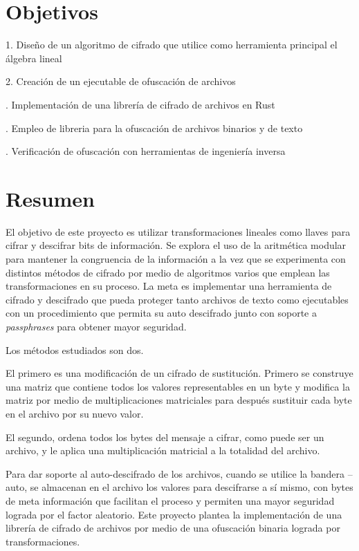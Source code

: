 \documentclass[a4paper]{article}
\begin{document}
\vfill
\newpage

\section{Objetivos}

1. Diseño de un algoritmo de cifrado que utilice como herramienta principal el
álgebra lineal

2. Creación de un ejecutable de ofuscación de archivos

. Implementación de una librería de cifrado de archivos en Rust

. Empleo de libreria para la ofuscación de archivos binarios y de
texto

. Verificación de ofuscación con herramientas de ingeniería inversa

\section{Resumen}

El objetivo de este proyecto es utilizar transformaciones lineales como llaves
para cifrar y descifrar bits de información.
Se explora el uso de la aritmética modular para mantener la congruencia de la
información
 a la vez que se experimenta con distintos métodos de cifrado por medio de
algoritmos varios que emplean las transformaciones en su proceso.
La meta es implementar una herramienta de cifrado y descifrado que pueda
proteger tanto archivos de texto como ejecutables con un procedimiento
que permita su auto descifrado junto con soporte a \textit{passphrases} para
obtener mayor seguridad.

Los métodos estudiados son dos. 

El primero es una modificación de un cifrado de sustitución. Primero se
construye una matriz que contiene todos los valores representables en un 
byte y modifica la matriz por medio de multiplicaciones matriciales para
después sustituir cada byte en el archivo por su nuevo valor. 

El segundo, ordena todos los bytes del mensaje a cifrar, como puede ser un
archivo, y le aplica una multiplicación matricial a la totalidad del archivo. 

Para dar soporte al auto-descifrado de los archivos, cuando se utilice la
bandera --auto, se almacenan en el archivo los valores para descifrarse a sí
mismo, 
con bytes de meta información que facilitan el proceso y permiten una mayor
seguridad lograda por el factor aleatorio. Este proyecto plantea la
implementación 
de una librería de cifrado de archivos por medio de una ofuscación binaria
lograda por transformaciones.
\end{document}
